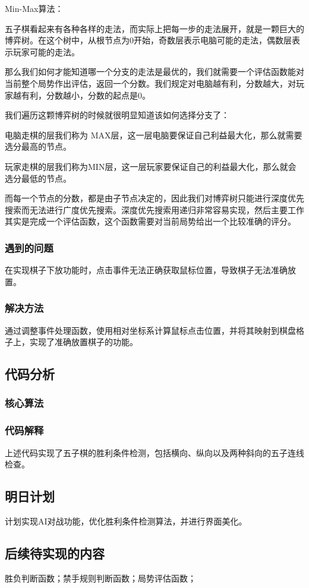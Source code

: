 Min-Max算法：

五子棋看起来有各种各样的走法，而实际上把每一步的走法展开，就是一颗巨大的博弈树。在这个树中，从根节点为0开始，奇数层表示电脑可能的走法，偶数层表示玩家可能的走法。

那么我们如何才能知道哪一个分支的走法是最优的，我们就需要一个评估函数能对当前整个局势作出评估，返回一个分数。我们规定对电脑越有利，分数越大，对玩家越有利，分数越小，分数的起点是0。

我们遍历这颗博弈树的时候就很明显知道该如何选择分支了：

电脑走棋的层我们称为 MAX层，这一层电脑要保证自己利益最大化，那么就需要选分最高的节点。

玩家走棋的层我们称为MIN层，这一层玩家要保证自己的利益最大化，那么就会选分最低的节点。

而每一个节点的分数，都是由子节点决定的，因此我们对博弈树只能进行深度优先搜索而无法进行广度优先搜索。深度优先搜索用递归非常容易实现，然后主要工作其实是完成一个评估函数，这个函数需要对当前局势给出一个比较准确的评分。




\subsubsection{遇到的问题}
在实现棋子下放功能时，点击事件无法正确获取鼠标位置，导致棋子无法准确放置。

\subsubsection{解决方法}
通过调整事件处理函数，使用相对坐标系计算鼠标点击位置，并将其映射到棋盘格子上，实现了准确放置棋子的功能。

\subsection{代码分析} %

\subsubsection{核心算法}


\subsubsection{代码解释}
上述代码实现了五子棋的胜利条件检测，包括横向、纵向以及两种斜向的五子连线检查。

\subsection{明日计划} %
计划实现AI对战功能，优化胜利条件检测算法，并进行界面美化。

\subsection{后续待实现的内容} %

胜负判断函数；禁手规则判断函数；局势评估函数；
